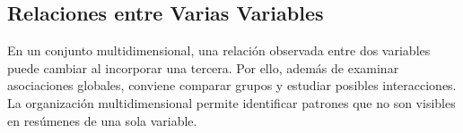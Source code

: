 \subsection{Relaciones entre Varias Variables}

En un conjunto multidimensional, una relación observada entre dos variables puede cambiar al incorporar una tercera. Por ello, además de examinar asociaciones globales, conviene comparar grupos y estudiar posibles interacciones. La organización multidimensional permite identificar patrones que no son visibles en resúmenes de una sola variable.